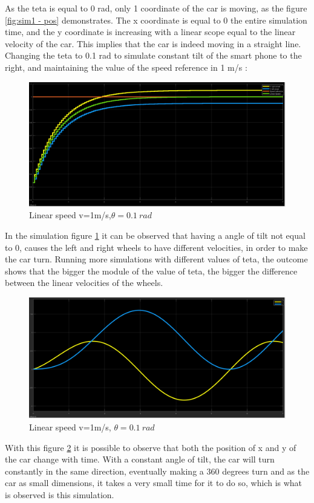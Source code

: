 As the teta is equal to 0 rad, only 1 coordinate of the car is moving, as the figure \ref{fig:sim1 - pos} demonstrates. The x coordinate is equal to 0 the entire simulation time, and the y coordinate is increasing with a linear scope equal to the linear velocity of the car. This implies that the car is indeed moving in a straight line.\\
\newpage
Changing the teta to 0.1 rad to simulate constant tilt of the smart phone to the right, and maintaining the value of the speed reference in 1 m/s :\
\begin{figure}[!h]
\centering
\includegraphics[width=1.0\textwidth]{./img/vel101.png}
\caption {\label{fig:sim2 - vel}Linear speed v=1m/s,$\theta = 0.1~\si{rad}$}
\end{figure}
In the simulation figure \ref{fig:sim2 - vel} it can be observed that having a angle of tilt not equal to 0, causes the left and right wheels to have different velocities, in order to make the car turn. Running more simulations with different values of teta, the outcome shows that the bigger the module of the value of teta, the bigger the difference between the linear velocities of the wheels.
\begin{figure}[!ht]
\centering
\includegraphics[width=1.0\textwidth]{./img/xy101.png}
\caption {\label{fig:sim2 - pos}Linear speed v=1m/s, $\theta = 0.1~\si{rad}$}
\end{figure}
With this figure \ref{fig:sim2 - pos} it is possible to observe that both the
position of x and y of the car change with time. With a constant angle of tilt,
the car will turn constantly in the same direction, eventually making a 360
degrees turn and as the car as small dimensions, it takes a very small time for
it to do so, which is what is observed is this simulation.
